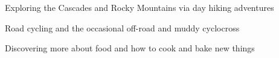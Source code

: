 

\begin{cventries}
\vspace{-4mm}

  \cventry
    {}
    {}
    {}
    {}
    {
      \begin{cvitems}
        \item {
          Exploring the Cascades and Rocky Mountains via day hiking adventures
        }
        \item {
          Road cycling and the occasional off-road and muddy cyclocross
        }
        \item {
          Discovering more about food and how to cook and bake new things
        }
      \end{cvitems}
    }
    {}

\end{cventries}
